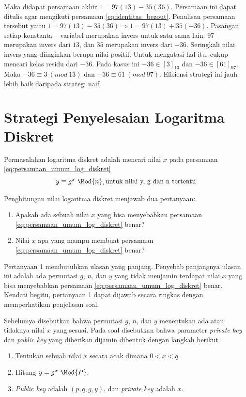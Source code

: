 Maka didapat persamaan akhir $ 1=97(13)-35(36) $. Persamaan ini dapat ditulis agar mengikuti persamaan \eqref{eq:identitas_bezout}. Penulisan persamaan tersebut yaitu $ 1=97(13)-35(36) \Rightarrow 1=97(13)+35(-36) $. Pasangan setiap konstanta -- variabel merupakan invers untuk satu sama lain. $ 97 $ merupakan invers dari $ 13 $, dan $ 35 $ merupakan invers dari $ -36 $. Seringkali nilai invers yang diinginkan berupa nilai positif. Untuk mengatasi hal itu, cukup mencari kelas residu dari $ -36 $. Pada kasus ini $ -36\in[3]_{13}$ dan $ -36\in[61]_{97} $. Maka $ -36\equiv3\ (mod\ 13) $ dan $ -36\equiv61\ (mod\ 97) $.
Efisiensi strategi ini jauh lebih baik daripada strategi naif.

\section{ Strategi Penyelesaian Logaritma Diskret}

Permasalahan logaritma diskret adalah mencari nilai $ x $ pada persamaan \eqref{eq:persamaan_umum_log_diskret}
\[
y \equiv g^{x}\ \Mod{n},\text{untuk nilai y, g dan n tertentu}
\]

Penghitungan nilai logaritma diskret menjawab dua pertanyaan:
\begin{enumerate}
\item Apakah ada sebuah nilai $ x $ yang bisa menyebabkan persamaan \eqref{eq:persamaan_umum_log_diskret} benar?
\item Nilai $ x $ apa yang mampu membuat persamaan \eqref{eq:persamaan_umum_log_diskret} benar?
\end{enumerate}

Pertanyaan 1 membutuhkan ulasan yang panjang. Penyebab panjangnya ulasan ini adalah ada permutasi $ g $, $ n $, dan $ y $ yang tidak menjamin terdapat nilai $ x $ yang bisa menyebabkan persamaan \eqref{eq:persamaan_umum_log_diskret} benar. Kendati begitu, pertanyaan 1 dapat dijawab secara ringkas dengan memperhatikan penjelasan soal. 

Sebelumya disebutkan bahwa permutasi $ g $, $ n $, dan $ y $ menentukan ada atau tidaknya nilai $ x $ yang sesuai. Pada soal disebutkan bahwa parameter \textit{private key} dan \textit{public key} yang diberikan dijamin dibentuk dengan langkah berikut.

\begin{enumerate}
\item Tentukan sebuah nilai $ x $ secara acak dimana $ 0 < x < q $.
\item Hitung $ y = g^x\ \Mod{P} $.
\item \textit{Public key} adalah $ (p, q, g, y) $, dan \textit{private key} adalah $ x $.
\end{enumerate}

